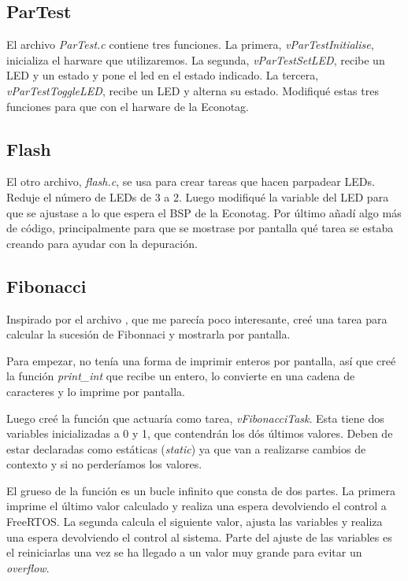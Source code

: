 \subsection{ParTest}
El archivo \emph{ParTest.c} contiene tres funciones. La primera, \emph{vParTestInitialise}, inicializa el harware que utilizaremos. La segunda, \emph{vParTestSetLED}, recibe un LED y un estado y pone el led en el estado indicado. La tercera, \emph{vParTestToggleLED}, recibe un LED y alterna su estado.
Modifiqué estas tres funciones para que  con el harware de la Econotag.\\

\subsection{Flash}
El otro archivo, \emph{flash.c}, se usa para crear tareas que hacen parpadear LEDs. Reduje el número de LEDs de 3 a 2. Luego modifiqué la variable del LED para que se ajustase a lo que espera el BSP de la Econotag.
Por último añadí algo más de código, principalmente para que se mostrase por pantalla qué tarea se estaba creando para ayudar con la depuración.\\

\subsection{Fibonacci}
Inspirado por el archivo , que me parecía poco interesante, creé una tarea para calcular la sucesión de Fibonnaci y mostrarla por pantalla.

Para empezar, no tenía una forma de imprimir enteros por pantalla, así que creé la función \emph{print\_int} que recibe un entero, lo convierte en una cadena de caracteres y lo imprime por pantalla.

Luego creé la función que actuaría como tarea, \emph{vFibonacciTask}. Esta tiene dos variables inicializadas a 0 y 1, que contendrán los dós últimos valores. Deben de estar declaradas como estáticas (\emph{static}) ya que van a realizarse cambios de contexto y si no perderíamos los valores.

El grueso de la función es un bucle infinito que consta de dos partes. La primera imprime el último valor calculado y realiza una espera devolviendo el control a FreeRTOS. La segunda calcula el siguiente valor, ajusta las variables y realiza una espera devolviendo el control al sistema. Parte del ajuste de las variables es el reiniciarlas una vez se ha llegado a un valor muy grande para evitar un \emph{overflow}.\\

